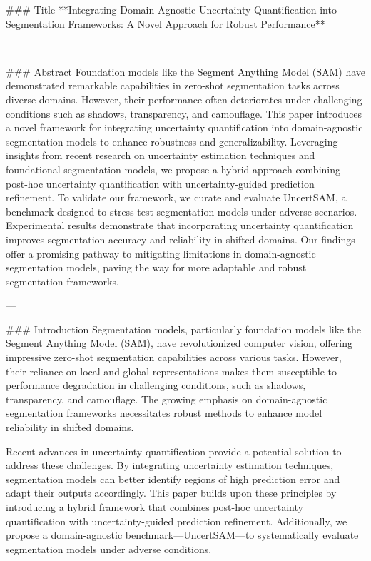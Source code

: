 ### Title  
**Integrating Domain-Agnostic Uncertainty Quantification into Segmentation Frameworks: A Novel Approach for Robust Performance**

---

### Abstract  
Foundation models like the Segment Anything Model (SAM) have demonstrated remarkable capabilities in zero-shot segmentation tasks across diverse domains. However, their performance often deteriorates under challenging conditions such as shadows, transparency, and camouflage. This paper introduces a novel framework for integrating uncertainty quantification into domain-agnostic segmentation models to enhance robustness and generalizability. Leveraging insights from recent research on uncertainty estimation techniques and foundational segmentation models, we propose a hybrid approach combining post-hoc uncertainty quantification with uncertainty-guided prediction refinement. To validate our framework, we curate and evaluate UncertSAM, a benchmark designed to stress-test segmentation models under adverse scenarios. Experimental results demonstrate that incorporating uncertainty quantification improves segmentation accuracy and reliability in shifted domains. Our findings offer a promising pathway to mitigating limitations in domain-agnostic segmentation models, paving the way for more adaptable and robust segmentation frameworks.

---

### Introduction  
Segmentation models, particularly foundation models like the Segment Anything Model (SAM), have revolutionized computer vision, offering impressive zero-shot segmentation capabilities across various tasks. However, their reliance on local and global representations makes them susceptible to performance degradation in challenging conditions, such as shadows, transparency, and camouflage. The growing emphasis on domain-agnostic segmentation frameworks necessitates robust methods to enhance model reliability in shifted domains.

Recent advances in uncertainty quantification provide a potential solution to address these challenges. By integrating uncertainty estimation techniques, segmentation models can better identify regions of high prediction error and adapt their outputs accordingly. This paper builds upon these principles by introducing a hybrid framework that combines post-hoc uncertainty quantification with uncertainty-guided prediction refinement. Additionally, we propose a domain-agnostic benchmark—UncertSAM—to systematically evaluate segmentation models under adverse conditions.

